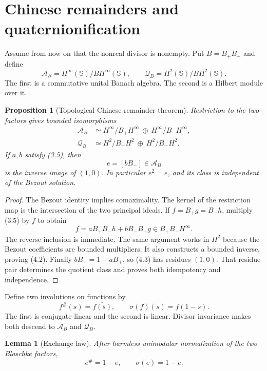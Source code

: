 \documentclass[11pt]{article}
\newtheorem{proposition}[theorem]{Proposition}
\newtheorem{lemma}[theorem]{Lemma}
\theoremstyle{definition}
\theoremstyle{remark}
\newcommand{\A}{\mathcal A}
\newcommand{\Q}{\mathcal Q}
\begin{document}
\section{Chinese remainders and quaternionification}

Assume from now on that the nonreal divisor is nonempty.  Put $B=B_+B_-$ and
define
\[
 \A_B=H^\infty(\mathbb S)/BH^\infty(\mathbb S),
 \qquad
 \Q_B=H^2(\mathbb S)/BH^2(\mathbb S).                \tag{4.1}
\]
The first is a commutative unital Banach algebra.  The second is a Hilbert
module over it.

\begin{proposition}[Topological Chinese remainder theorem]
\label{prop:crt}
Restriction to the two factors gives bounded isomorphisms
\[
 \begin{split}
 \A_B&\simeq
 H^\infty/B_+H^\infty\ \oplus\ H^\infty/B_-H^\infty,\\
 \Q_B&\simeq
 H^2/B_+H^2\ \oplus\ H^2/B_-H^2.
 \end{split}                                           \tag{4.2}
\]
If $a,b$ satisfy (3.5), then
\[
                   e=[bB_-]\in\A_B                 \tag{4.3}
\]
is the inverse image of $(1,0)$.  In particular $e^2=e$, and its class is
independent of the Bezout solution.
\end{proposition}

\begin{proof}
The Bezout identity implies comaximality.  The kernel of the restriction map is
the intersection of the two principal ideals.  If $f=B_+g=B_-h$, multiply
(3.5) by $f$ to obtain
\[
 f=aB_+B_-h+bB_-B_+g\in B_+B_-H^\infty.
\]
The reverse inclusion is immediate.  The same argument works in $H^2$ because
the Bezout coefficients are bounded multipliers.  It also constructs a bounded
inverse, proving (4.2).  Finally $bB_-=1-aB_+$, so (4.3) has residues $(1,0)$.
That residue pair determines the quotient class and proves both idempotency and
independence.
\end{proof}

Define two involutions on functions by
\[
       f^\#(s)=\overline{f(\bar s)},\qquad
       \sigma(f)(s)=f(1-s).                           \tag{4.4}
\]
The first is conjugate-linear and the second is linear.  Divisor invariance
makes both descend to $\A_B$ and $\Q_B$.

\begin{lemma}[Exchange law]\label{lem:exchange}
After harmless unimodular normalization of the two Blaschke factors,
\[
             e^\#=1-e,\qquad \sigma(e)=1-e.           \tag{4.5}
\]
\end{lemma}
\end{document}
